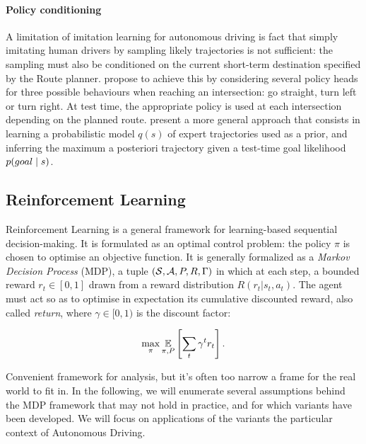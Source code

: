 \paragraph{Policy conditioning} A limitation of imitation learning for autonomous driving is fact that simply imitating human drivers by sampling likely trajectories is not sufficient: the sampling must also be conditioned on the current short-term destination specified by the Route planner. \citep{Codevilla2018} propose to achieve this by considering several policy heads for three possible behaviours when reaching an intersection: go straight, turn left or turn right. At test time, the appropriate policy is used at each intersection depending on the planned route. \citep{Rhinehart2020} present a more general approach that consists in learning a probabilistic model $q(s)$ of expert trajectories used as a prior, and inferring the maximum a posteriori trajectory given a test-time goal likelihood $p\lparen goal\mid s\rparen$.

\subsection{Reinforcement Learning}

Reinforcement Learning is a general framework for learning-based sequential decision-making. It is formulated as an optimal control problem: the policy $\pi$ is chosen to optimise an objective function. It is generally formalized as a \emph{Markov Decision Process} (MDP), a tuple $(\mathcal{S}, \mathcal{A}, P, R, \Gamma)$ in which at each step, a bounded reward $r_t\in[0, 1]$ drawn from a reward distribution $R(r_t|s_t,a_t)$. The agent must act so as to optimise in expectation its cumulative discounted reward, also called \emph{return}, where $\gamma\in[0,1)$ is the discount factor:

\begin{equation*}
\max_{\pi}\operatorname*{\mathbb{E}}_{\pi, P} \left[\sum_t \gamma^t r_t\right].
\end{equation*}


Convenient framework for analysis, but it's often too narrow a frame for the real world to fit in. In the following, we will enumerate several assumptions behind the MDP framework that may not hold in practice, and for which variants have been developed. We will focus on applications of the variants the particular context of Autonomous Driving.

